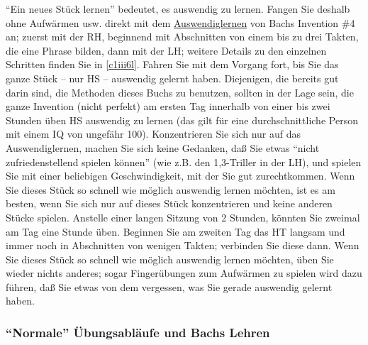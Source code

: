 \enquote{Ein neues Stück lernen} bedeutet, es auswendig zu lernen.
Fangen Sie deshalb ohne Aufwärmen usw. direkt mit dem \hyperref[c1iii6]{Auswendiglernen} von Bachs Invention \#4 an; zuerst mit der RH, beginnend mit Abschnitten von einem bis zu drei Takten, die eine Phrase bilden, dann mit der LH; weitere Details zu den einzelnen Schritten finden Sie in \hyperref[c1iii6l]{\autoref{c1iii6l}}.
Fahren Sie mit dem Vorgang fort, bis Sie das ganze Stück -- nur HS -- auswendig gelernt haben.
Diejenigen, die bereits gut darin sind, die Methoden dieses Buchs zu benutzen, sollten in der Lage sein, die ganze Invention (nicht perfekt) am ersten Tag innerhalb von einer bis zwei Stunden üben HS auswendig zu lernen (das gilt für eine durchschnittliche Person mit einem IQ von ungefähr 100).
Konzentrieren Sie sich nur auf das Auswendiglernen, machen Sie sich keine Gedanken, daß Sie etwas \enquote{nicht zufriedenstellend spielen können} (wie z.B. den 1,3-Triller in der LH), und spielen Sie mit einer beliebigen Geschwindigkeit, mit der Sie gut zurechtkommen.
Wenn Sie dieses Stück so schnell wie möglich auswendig lernen möchten, ist es am besten, wenn Sie sich nur auf dieses Stück konzentrieren und keine anderen Stücke spielen.
Anstelle einer langen Sitzung von 2 Stunden, könnten Sie zweimal am Tag eine Stunde üben.
Beginnen Sie am zweiten Tag das HT langsam und immer noch in Abschnitten von wenigen Takten; verbinden Sie diese dann.
Wenn Sie dieses Stück so schnell wie möglich auswendig lernen möchten, üben Sie wieder nichts anderes; sogar Fingerübungen zum Aufwärmen zu spielen wird dazu führen, daß Sie etwas von dem vergessen, was Sie gerade auswendig gelernt haben.


\subsubsection{\enquote{Normale} Übungsabläufe und Bachs Lehren}
\label{c1iii19c}  


